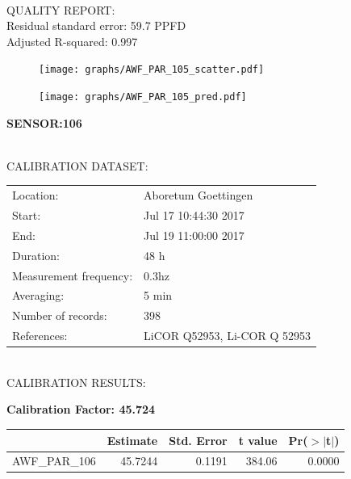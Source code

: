 \documentclass[oneside]{report}
\begin{document}
\hrulefill\\
QUALITY REPORT:\\
Residual standard error: 59.7 PPFD\\
Adjusted R-squared: 0.997



\begin{figure}[H]
  \centering
  \texttt{[image: graphs/AWF\_PAR\_105\_scatter.pdf]}
\end{figure}




\begin{figure}[H]
  \centering
  \texttt{[image: graphs/AWF\_PAR\_105\_pred.pdf]}
\end{figure}

\pagebreak


\begin{center}
\large{\textbf{SENSOR:106}}\\
\end{center}

\hrulefill\\
CALIBRATION DATASET:\\
\begin{table}[h!]
  \centering
  \label{tab:table1}
  \begin{tabular}{ll}
    Location: & Aboretum Goettingen\\ 
    
    
    Start:  & Jul 17 10:44:30 2017 \\
    End:   & Jul 19 11:00:00 2017\\ 
    Duration: & 48 h\\
    Measurement frequency: & 0.3hz\\
    Averaging:  &5 min\\
    Number of records: & 398 \\
    References: & LiCOR Q52953, Li-COR Q 52953 \\
  \end{tabular}
\end{table}

\hrulefill\\
CALIBRATION RESULTS:\\


\begin{center}
\textbf{\large{Calibration Factor: 45.724}}\\
\end{center}
\begin{table}[ht]
\centering
\begin{tabular}{rrrrr}
  \hline
 & Estimate & Std. Error & t value & Pr($>$$|$t$|$) \\ 
  \hline
AWF\_PAR\_106 & 45.7244 & 0.1191 & 384.06 & 0.0000 \\ 
   \hline
\end{tabular}
\end{table}
\end{document}
